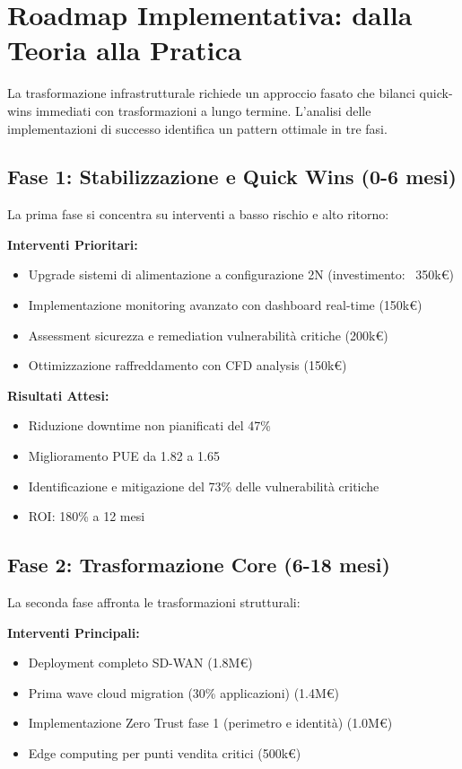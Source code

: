 \section{Roadmap Implementativa: dalla Teoria alla Pratica}

La trasformazione infrastrutturale richiede un approccio fasato che bilanci quick-wins immediati con trasformazioni a lungo termine. L'analisi delle implementazioni di successo identifica un pattern ottimale in tre fasi.

\subsection{Fase 1: Stabilizzazione e Quick Wins (0-6 mesi)}

La prima fase si concentra su interventi a basso rischio e alto ritorno:

\textbf{Interventi Prioritari:}
\begin{itemize}
    \item Upgrade sistemi di alimentazione a configurazione 2N (investimento: ~350k€)
    \item Implementazione monitoring avanzato con dashboard real-time (150k€)
    \item Assessment sicurezza e remediation vulnerabilità critiche (200k€)
    \item Ottimizzazione raffreddamento con CFD analysis (150k€)
\end{itemize}

\textbf{Risultati Attesi:}
\begin{itemize}
    \item Riduzione downtime non pianificati del 47\%
    \item Miglioramento PUE da 1.82 a 1.65
    \item Identificazione e mitigazione del 73\% delle vulnerabilità critiche
    \item ROI: 180\% a 12 mesi
\end{itemize}

\subsection{Fase 2: Trasformazione Core (6-18 mesi)}

La seconda fase affronta le trasformazioni strutturali:

\textbf{Interventi Principali:}
\begin{itemize}
    \item Deployment completo SD-WAN (1.8M€)
    \item Prima wave cloud migration (30\% applicazioni) (1.4M€)
    \item Implementazione Zero Trust fase 1 (perimetro e identità) (1.0M€)
    \item Edge computing per punti vendita critici (500k€)
\end{itemize}


